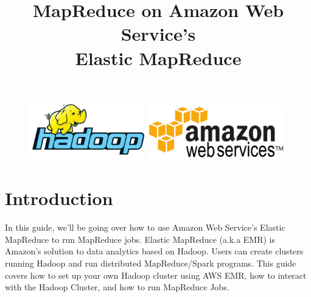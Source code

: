 \documentclass{article}
\title{MapReduce on Amazon Web Service's\\ Elastic MapReduce} %
\date{\vspace{-8ex}} %
\begin{document}
\maketitle %


\begin{figure}[h!]
 \centering
 \includegraphics[width=50mm]{images/hadoop}\hspace{15mm}
 \includegraphics[width=60mm]{images/AWS}
\end{figure} 


\section*{Introduction} %

In this guide, we'll be going over how to use Amazon Web Service's Elastic MapReduce to run MapReduce jobs. Elastic MapReduce (a.k.a EMR) is Amazon's solution to data analytics based on Hadoop. Users can create clusters running Hadoop and run distributed MapReduce/Spark programs. This guide covers how to set up your own Hadoop cluster using AWS EMR, how to interact with the Hadoop Cluster, and how to run MapReduce Jobs.


\hypersetup{hidelinks}
\tableofcontents

\end{document}

